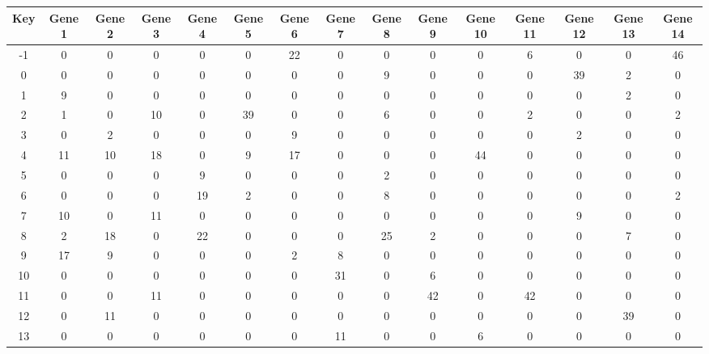 \begin{tabular}{|c|c|c|c|c|c|c|c|c|c|c|c|c|c|c|}
\hline
Key & Gene 1 & Gene 2 & Gene 3 & Gene 4 & Gene 5 & Gene 6 & Gene 7 & Gene 8 & Gene 9 & Gene 10 & Gene 11 & Gene 12 & Gene 13 & Gene 14 \\
\hline
-1 & 0 & 0 & 0 & 0 & 0 & 22 & 0 & 0 & 0 & 0 & 6 & 0 & 0 & 46 \\
0 & 0 & 0 & 0 & 0 & 0 & 0 & 0 & 9 & 0 & 0 & 0 & 39 & 2 & 0 \\
1 & 9 & 0 & 0 & 0 & 0 & 0 & 0 & 0 & 0 & 0 & 0 & 0 & 2 & 0 \\
2 & 1 & 0 & 10 & 0 & 39 & 0 & 0 & 6 & 0 & 0 & 2 & 0 & 0 & 2 \\
3 & 0 & 2 & 0 & 0 & 0 & 9 & 0 & 0 & 0 & 0 & 0 & 2 & 0 & 0 \\
4 & 11 & 10 & 18 & 0 & 9 & 17 & 0 & 0 & 0 & 44 & 0 & 0 & 0 & 0 \\
5 & 0 & 0 & 0 & 9 & 0 & 0 & 0 & 2 & 0 & 0 & 0 & 0 & 0 & 0 \\
6 & 0 & 0 & 0 & 19 & 2 & 0 & 0 & 8 & 0 & 0 & 0 & 0 & 0 & 2 \\
7 & 10 & 0 & 11 & 0 & 0 & 0 & 0 & 0 & 0 & 0 & 0 & 9 & 0 & 0 \\
8 & 2 & 18 & 0 & 22 & 0 & 0 & 0 & 25 & 2 & 0 & 0 & 0 & 7 & 0 \\
9 & 17 & 9 & 0 & 0 & 0 & 2 & 8 & 0 & 0 & 0 & 0 & 0 & 0 & 0 \\
10 & 0 & 0 & 0 & 0 & 0 & 0 & 31 & 0 & 6 & 0 & 0 & 0 & 0 & 0 \\
11 & 0 & 0 & 11 & 0 & 0 & 0 & 0 & 0 & 42 & 0 & 42 & 0 & 0 & 0 \\
12 & 0 & 11 & 0 & 0 & 0 & 0 & 0 & 0 & 0 & 0 & 0 & 0 & 39 & 0 \\
13 & 0 & 0 & 0 & 0 & 0 & 0 & 11 & 0 & 0 & 6 & 0 & 0 & 0 & 0 \\
\hline
\end{tabular}